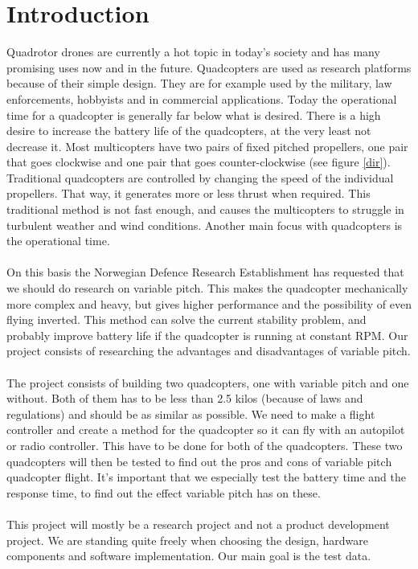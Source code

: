 \section{Introduction}

Quadrotor drones are  currently a hot topic in today’s society and has many promising uses now and in the future. Quadcopters are used as research platforms because of their simple design. They are for example used by the military, law enforcements, hobbyists and in commercial applications. Today the operational time for a quadcopter is generally far below what is desired. There is a high desire to increase the battery life of the quadcopters, at the very least not decrease it. Most multicopters have two pairs of fixed pitched propellers, one pair that goes clockwise and one pair that goes counter-clockwise (see figure \ref{dir}). Traditional quadcopters are controlled by changing the speed of the individual propellers. That way, it generates more or less thrust when required. This traditional method is not fast enough, and causes the multicopters to struggle in turbulent weather and wind conditions. Another main focus with quadcopters is the operational time. \\
\\
On this basis the Norwegian Defence Research Establishment has requested that we should do research on variable pitch. This makes the quadcopter mechanically more complex and heavy, but gives higher performance and the possibility of even flying inverted. This method can solve the current stability problem, and probably improve battery life if the quadcopter is running at constant RPM. Our project consists of researching the advantages and disadvantages of variable pitch. \\
\\
The project consists of building two quadcopters, one with variable pitch and one without. Both of them has to be less than 2.5 kilos (because of laws and regulations) and should be as similar as possible. We need to make a flight controller and create a method for the quadcopter so it can fly with an autopilot or radio controller. This have to be done for both of the quadcopters. These two quadcopters will then be tested to find out the pros and cons of variable pitch quadcopter flight. It’s important that we especially test the battery time and the response time, to find out the effect variable pitch has on these.\\
\\
This project will mostly be a research project and not a product development project. We are standing quite freely when choosing the design, hardware components and software implementation. Our main goal is the test data.
